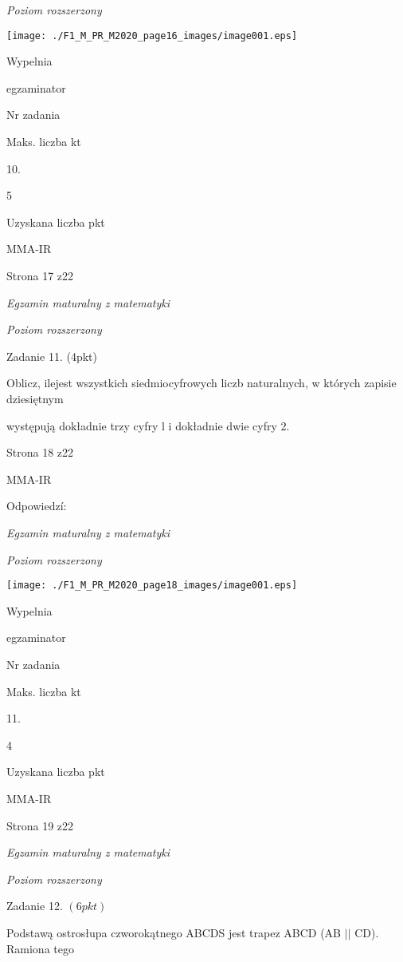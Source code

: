 \documentclass[a4paper,12pt]{article}
\begin{document}
{\it Poziom rozszerzony}
\begin{center}
\texttt{[image: ./F1\_M\_PR\_M2020\_page16\_images/image001.eps]}
\end{center}
Wypelnia

egzaminator

Nr zadania

Maks. liczba kt

10.

5

Uzyskana liczba pkt

MMA-IR

Strona 17 z22





{\it Egzamin maturalny z matematyki}

{\it Poziom rozszerzony}

Zadanie 11. (4pkt)

Oblicz, ilejest wszystkich siedmiocyfrowych liczb naturalnych, w których zapisie dziesiętnym

występują dokładnie trzy cyfry l i dokładnie dwie cyfry 2.

Strona 18 z22

MMA-IR





Odpowiedzí:

{\it Egzamin maturalny z matematyki}

{\it Poziom rozszerzony}
\begin{center}
\texttt{[image: ./F1\_M\_PR\_M2020\_page18\_images/image001.eps]}
\end{center}
Wypelnia

egzaminator

Nr zadania

Maks. liczba kt

11.

4

Uzyskana liczba pkt

MMA-IR

Strona 19 z22





{\it Egzamin maturalny z matematyki}

{\it Poziom rozszerzony}

Zadanie 12. $(6pkt)$

Podstawą ostrosłupa czworokątnego ABCDS jest trapez ABCD (AB $||$ CD). Ramiona tego
\end{document}
